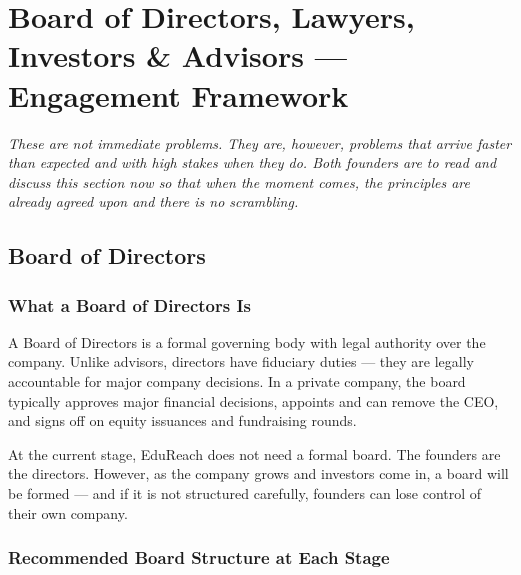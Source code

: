 \documentclass[12pt,a4paper]{article}
\begin{document}
\section{Board of Directors, Lawyers, Investors \& Advisors --- Engagement Framework}

\begin{notebox}
\textit{These are not immediate problems. They are, however, problems that arrive faster than expected and with high stakes when they do. Both founders are to read and discuss this section now so that when the moment comes, the principles are already agreed upon and there is no scrambling.}
\end{notebox}

\subsection{Board of Directors}

\subsubsection{What a Board of Directors Is}

A Board of Directors is a formal governing body with legal authority over the company. Unlike advisors, directors have fiduciary duties --- they are legally accountable for major company decisions. In a private company, the board typically approves major financial decisions, appoints and can remove the CEO, and signs off on equity issuances and fundraising rounds.

At the current stage, EduReach does not need a formal board. The founders are the directors. However, as the company grows and investors come in, a board will be formed --- and if it is not structured carefully, founders can lose control of their own company.

\subsubsection{Recommended Board Structure at Each Stage}
\end{document}
